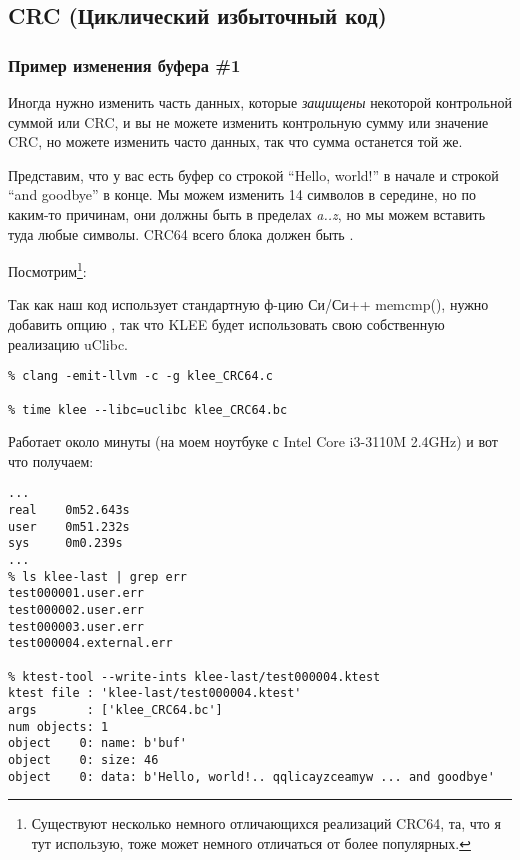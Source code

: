 \subsection{CRC (Циклический избыточный код)}

\renewcommand{\CURPATH}{CRC/KLEE}

\subsubsection{Пример изменения буфера \#1}

Иногда нужно изменить часть данных, которые \textit{защищены} некоторой контрольной суммой или
\ac{CRC}, и вы не можете изменить контрольную сумму или значение CRC, но можете изменить часто данных, так что
сумма останется той же.

Представим, что у вас есть буфер со строкой ``Hello, world!'' в начале и строкой ``and goodbye'' в конце.
Мы можем изменить 14 символов в середине, но по каким-то причинам, они должны быть в пределах \textit{a..z}, но мы можем
вставить туда любые символы.
CRC64 всего блока должен быть .

Посмотрим\footnote{Существуют несколько немного отличающихся реализаций CRC64, та, что я тут использую, тоже может немного
отличаться от более популярных.}:



Так как наш код использует стандартную ф-цию Си/Си++ memcmp(), нужно добавить опцию , так что
KLEE будет использовать свою собственную реализацию uClibc.

\begin{lstlisting}
% clang -emit-llvm -c -g klee_CRC64.c

% time klee --libc=uclibc klee_CRC64.bc
\end{lstlisting}

Работает около минуты (на моем ноутбуке с Intel Core i3-3110M 2.4GHz) и вот что получаем:

\begin{lstlisting}
...
real    0m52.643s
user    0m51.232s
sys     0m0.239s
...
% ls klee-last | grep err
test000001.user.err
test000002.user.err
test000003.user.err
test000004.external.err

% ktest-tool --write-ints klee-last/test000004.ktest
ktest file : 'klee-last/test000004.ktest'
args       : ['klee_CRC64.bc']
num objects: 1
object    0: name: b'buf'
object    0: size: 46
object    0: data: b'Hello, world!.. qqlicayzceamyw ... and goodbye'
\end{lstlisting}

